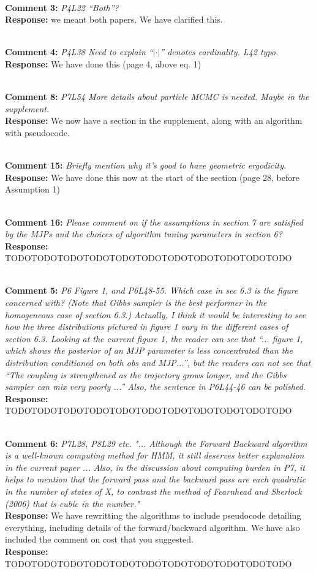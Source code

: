 \documentclass[11pt]{article}
\newcommand{\rev}[2]{\textbf{Comment #1: }\emph{#2}}
\newcommand{\resp}{\textbf{Response: }}
\begin{document}
~\\
\noindent \rev{3}{P4L22 “Both”?} \\
\resp{we meant both papers. We have clarified this.}

~\\
\noindent \rev{4}{P4L38 Need to explain “$| \cdot |$” denotes cardinality. L42 typo.} \\
\resp We have done this (page 4, above eq. 1)

~\\
\noindent \rev{8}{P7L54 More details about particle MCMC is needed. Maybe in the supplement.} \\
\resp We now have a section in the supplement, along with an algorithm with pseudocode.

~\\
\noindent \rev{15}{Briefly mention why it’s good to have geometric ergodicity.} \\
\resp We have done this now at the start of the section (page 28, before Assumption 1) 

~\\
\noindent \rev{16}{Please comment on if the assumptions in section 7 are satisfied by the MJPs and the
choices of algorithm tuning parameters in section 6?}\\
\resp{TODOTODOTODOTODOTODOTODOTODOTODOTODOTODOTODO}

~\\ 
\rev{5}{P6 Figure 1, and P6L48-55. Which case in sec 6.3 is the figure concerned with? (Note that Gibbs sampler is the best performer in the homogeneous case of section 6.3.) Actually, I think it would be interesting to see how the three distributions pictured in figure 1 vary in the different cases of section 6.3. Looking at the current figure 1, the reader can see that “... figure 1, which shows the posterior of an MJP parameter is less concentrated than the distribution conditioned on both obs and MJP...”, but the readers can not see that “The coupling is strengthened as the trajectory grows longer, and the Gibbs sampler can mix very poorly ...” 
Also, the sentence in P6L44-46 can be polished.}\\
\resp{TODOTODOTODOTODOTODOTODOTODOTODOTODOTODOTODO}

~\\
\noindent \rev{6}{P7L28, P8L29 etc. "... Although the Forward Backward algorithm is a well-known computing method for HMM, it still deserves better explanation in the current paper ...  Also, in the discussion about computing burden in P7, it helps to mention that the forward pass and the backward pass are each quadratic in the number of states of X, to contrast the method of Fearnhead and Sherlock (2006) that is cubic in the number."}
\\ 
\resp{We have rewritting the algorithms to include pseudocode detailing everything, including details of the forward/backward algorithm. We have also included the comment on cost that you suggested.} \\
\resp{TODOTODOTODOTODOTODOTODOTODOTODOTODOTODOTODO}
\end{document}
